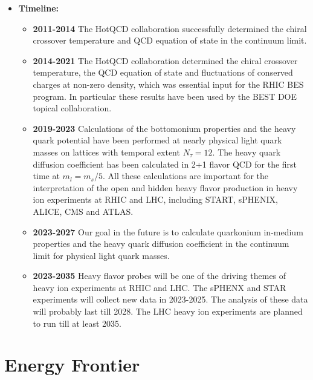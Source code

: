 \documentclass[12pt,hyperpdf]{article}
\begin{document}
\begin{itemize}
  \item{\bf Timeline:}
\begin{itemize}
   \item{\bf 2011-2014} The HotQCD collaboration successfully determined
     the chiral crossover temperature and QCD equation of state in the
     continuum limit. 
   \item{\bf 2014-2021} The HotQCD collaboration determined the chiral
     crossover temperature, the QCD equation of state and fluctuations
     of conserved charges at non-zero density, which was essential
     input for the RHIC BES program. In particular these results have
     been used by the BEST DOE topical collaboration.
   \item{\bf 2019-2023} Calculations of the bottomonium properties and the
     heavy quark potential have been performed at nearly physical
     light quark masses on lattices with temporal extent
     $N_{\tau}=12$. The heavy quark diffusion coefficient has been
     calculated in 2+1 flavor QCD for the first time at
     $m_l=m_s/5$. All these calculations are important for the
     interpretation of the open and hidden heavy flavor production in
     heavy ion experiments at RHIC and LHC, including START, sPHENIX,
     ALICE, CMS and ATLAS.
   \item{\bf 2023-2027} Our goal in the future is to calculate quarkonium
     in-medium properties and the heavy quark diffusion coefficient in
     the continuum limit for physical light quark masses.
   \item{\bf 2023-2035} Heavy flavor probes will be one of the driving
     themes of heavy ion experiments at RHIC and LHC. The sPHENX and
     STAR experiments will collect new data in 2023-2025. The analysis
     of these data will probably last till 2028. The LHC heavy ion
     experiments are planned to run till at least 2035. 
\end{itemize}
\end{itemize}


\section{Energy Frontier}\label{sec:energy}


\end{document}
